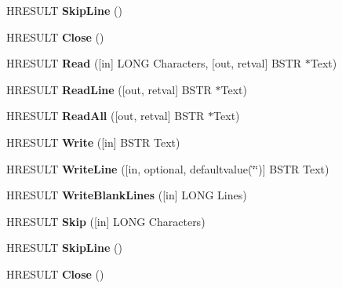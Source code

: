 \begin{DoxyCompactItemize}
H\+R\+E\+S\+U\+LT {\bfseries Skip\+Line} ()
\item 
\mbox{\label{interface_i_host_1_1_i_text_stream_a914fb9b3b0b2f07264f32da7b167627a}} 
H\+R\+E\+S\+U\+LT {\bfseries Close} ()
\item 
\mbox{\label{interface_i_host_1_1_i_text_stream_a5a134071e45277787b47e7cd82907eae}} 
H\+R\+E\+S\+U\+LT {\bfseries Read} (\mbox{[}in\mbox{]} L\+O\+NG Characters, \mbox{[}out, retval\mbox{]} B\+S\+TR $\ast$Text)
\item 
\mbox{\label{interface_i_host_1_1_i_text_stream_acec2ca0591d02841cda583d011179600}} 
H\+R\+E\+S\+U\+LT {\bfseries Read\+Line} (\mbox{[}out, retval\mbox{]} B\+S\+TR $\ast$Text)
\item 
\mbox{\label{interface_i_host_1_1_i_text_stream_a444c00e0d5e8b20d182c43d176b29b7e}} 
H\+R\+E\+S\+U\+LT {\bfseries Read\+All} (\mbox{[}out, retval\mbox{]} B\+S\+TR $\ast$Text)
\item 
\mbox{\label{interface_i_host_1_1_i_text_stream_a9a4e42d787940d1fc448226e72858803}} 
H\+R\+E\+S\+U\+LT {\bfseries Write} (\mbox{[}in\mbox{]} B\+S\+TR Text)
\item 
\mbox{\label{interface_i_host_1_1_i_text_stream_af765e8bc22b2d391f88a80dfb883384e}} 
H\+R\+E\+S\+U\+LT {\bfseries Write\+Line} (\mbox{[}in, optional, defaultvalue(\char`\"{}\char`\"{})\mbox{]} B\+S\+TR Text)
\item 
\mbox{\label{interface_i_host_1_1_i_text_stream_a9cd01ac64b71dce6fe004fdc0818f333}} 
H\+R\+E\+S\+U\+LT {\bfseries Write\+Blank\+Lines} (\mbox{[}in\mbox{]} L\+O\+NG Lines)
\item 
\mbox{\label{interface_i_host_1_1_i_text_stream_a28c7f0ec5aea72aa4821493d5f06d599}} 
H\+R\+E\+S\+U\+LT {\bfseries Skip} (\mbox{[}in\mbox{]} L\+O\+NG Characters)
\item 
\mbox{\label{interface_i_host_1_1_i_text_stream_af33e1deda64853c6029ede63d9503f99}} 
H\+R\+E\+S\+U\+LT {\bfseries Skip\+Line} ()
\item 
\mbox{\label{interface_i_host_1_1_i_text_stream_a914fb9b3b0b2f07264f32da7b167627a}} 
H\+R\+E\+S\+U\+LT {\bfseries Close} ()
\end{DoxyCompactItemize}
